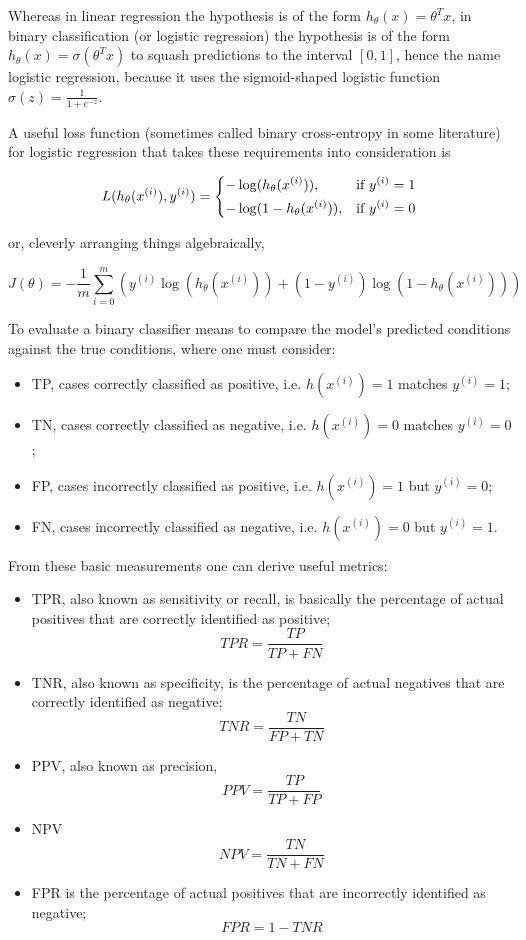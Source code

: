 Whereas in linear regression the hypothesis is of the form $h_{\theta}(x) = \theta^Tx$, in binary classification (or logistic regression) the hypothesis is of the form $h_{\theta}(x) = \sigma(\theta^Tx)$ to squash predictions to the interval $[0, 1]$, hence the name logistic regression, because it uses the sigmoid-shaped logistic function $\sigma(z) = \frac{1}{1 + e^{-z}}$.

A useful loss function (sometimes called binary cross-entropy in some literature) for logistic regression that takes these requirements into consideration is

$$
L(h_{\theta}(x^{(i)}), y^{(i)}) =
\begin{dcases}
    -\log(h_{\theta}(x^{(i)})),& \text{if } y^{(i)} = 1\\
    -\log(1 - h_{\theta}(x^{(i)})),& \text{if } y^{(i)} = 0
\end{dcases}
$$

or, cleverly arranging things algebraically,

$$
J(\theta) = -\frac{1}{m} \sum_{i=0}^{m} ( y^{(i)}\log(h_{\theta}(x^{(i)})) + (1 - y^{(i)})\log(1 - h_{\theta}(x^{(i)})) )
$$

To evaluate a binary classifier means to compare the model's predicted conditions against the true conditions, where one must consider:

\begin{itemize}
    \item \ac{TP}, cases correctly classified as positive, i.e. $h(x^{(i)}) = 1$ matches $y^{(i)} = 1$;
    \item \ac{TN}, cases correctly classified as negative, i.e. $h(x^{(i)}) = 0$ matches $y^{(i)} = 0$;
    \item \ac{FP}, cases incorrectly classified as positive, i.e. $h(x^{(i)}) = 1$ but $y^{(i)} = 0$;
    \item \ac{FN}, cases incorrectly classified as negative, i.e. $h(x^{(i)}) = 0$ but $y^{(i)} = 1$.
\end{itemize}

From these basic measurements one can derive useful metrics:

\begin{itemize}
    \item \ac{TPR}, also known as sensitivity or recall, is basically the percentage of actual positives that are correctly identified as positive;
        $$TPR = \frac{TP}{TP + FN}$$
    \item \ac{TNR}, also known as specificity, is the percentage of actual negatives that are correctly identified as negative;
        $$TNR = \frac{TN}{FP + TN}$$
    \item \ac{PPV}, also known as precision,
        $$PPV = \frac{TP}{TP + FP}$$
    \item \ac{NPV}
        $$NPV = \frac{TN}{TN + FN}$$
    \item \ac{FPR} is the percentage of actual positives that are incorrectly identified as negative;
        $$FPR = 1 - TNR$$
\end{itemize}

